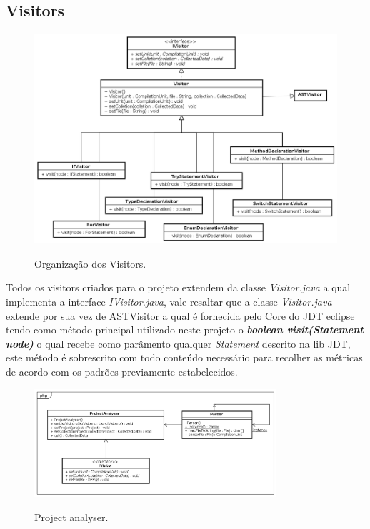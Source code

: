 \subsection{Visitors}
\begin{figure}[h]
\center
\includegraphics[width=1.0\textwidth]{Imagens/Visitors}
\label{arquiteturaVisitor}
\caption{Organização dos Visitors.}
\end{figure}

Todos os visitors criados para o projeto extendem da classe \textit{Visitor.java} a qual implementa a interface \textit{IVisitor.java}, vale resaltar que a classe \textit{Visitor.java} extende por sua vez de ASTVisitor a qual é fornecida pelo Core do JDT eclipse tendo como método principal utilizado neste projeto o \textbf{{\it boolean visit(Statement node)}} o qual recebe como parâmento qualquer {\it Statement} descrito na lib JDT, este método é sobrescrito com todo conteúdo necessário para recolher as métricas de acordo com os padrões previamente estabelecidos.\\


\clearpage
\begin{figure}[h]
	\center
	\includegraphics[width=0.8\textwidth]{Imagens/ProjectAnalyser}
	\label{ProjectAnalyser}
	\caption{Project analyser.}
\end{figure}

